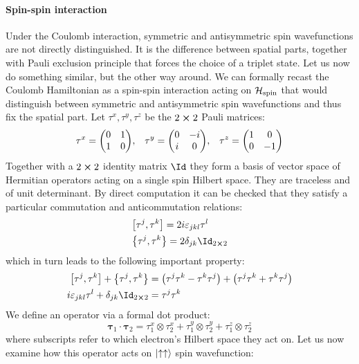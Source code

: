 \paragraph{Spin-spin interaction}Under the Coulomb interaction, symmetric and antisymmetric spin wavefunctions are not
directly distinguished. It is the difference between spatial parts, together with Pauli
exclusion principle that forces the choice of a triplet state. Let us now do something
similar, but the other way around. We can formally recast the Coulomb Hamiltonian as a
spin-spin interaction acting on \(\mathcal{H}_{\textrm{spin}}\) that would distinguish
between symmetric and antisymmetric spin wavefunctions and thus fix the spatial part.
Let \(\tau^x,\tau^y,\tau^z\) be the \(2\cross 2\) Pauli matrices:
\begin{equation}
\tau^x = \mqty(\pmat{1}),\;\;\;\tau^y = \mqty(\pmat{2}),\;\;\;\tau^z= \mqty(\pmat{3})
\label{eq:Pauli matrices}
\end{equation}
Together with a \(2\cross 2\) identity matrix \(\Id\) they form a basis of vector space of
Hermitian operators acting on a single spin Hilbert space.
They are traceless and of unit determinant. By direct computation it can be checked that
they satisfy a particular commutation and anticommutation relations:
\begin{align}
    &\comm{\tau^j}{\tau^k} = 2 i \varepsilon_{jkl}\tau^{l}\\
    &\anticommutator{\tau^j}{\tau^k} = 2 \delta_{jk} \Id_{2\cross 2}
\end{align}
which in turn leads to the following important property:
\begin{align}
        \comm{\tau^{j}}{\tau^{k}} + \anticommutator{\tau^{j}}{\tau^{k}} 
    &=\left(\tau^{j} \tau^{k}-\tau^{k} \tau^{j}\right)+\left(\tau^{j} \tau^{k}+\tau^{k} 
    \tau^{j}\right) \nonumber \\
    i \varepsilon_{j k l} \tau^{l}+\delta_{j k} \Id_{2\cross 2} &= \tau^{j} \tau^{k}
\end{align}
We define an operator via a formal dot product:
\begin{equation}
    \bm{\tau}_1 \cdot \bm{\tau}_2 = \tau_1^x \otimes \tau_2^x + \tau_1^y \otimes \tau_2^y +
    \tau_1^z \otimes \tau_2^z  
\end{equation}
where subscripts refer to which electron's Hilbert space they act on. 
Let us now examine how this operator acts on \(\ket{\uparrow\uparrow}\) spin wavefunction:
